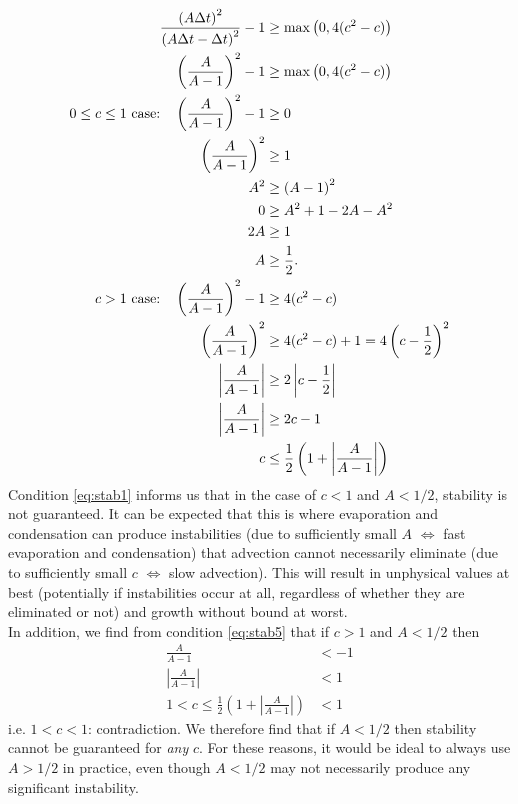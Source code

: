 \documentclass[11pt]{article}
\begin{document}
\begin{align}
\frac{\left(A\Delta t\right)^2}{\left(A\Delta t-\Delta t\right)^2}-1 &\geq \max\left(0,4(c^2-c)\right) \nonumber\\
\left(\frac{A}{A-1}\right)^2 -1 &\geq \max\left(0,4(c^2-c)\right) \nonumber\\
\text{$0\leq c\leq 1$ case:\quad} \left(\frac{A}{A-1}\right)^2 -1 &\geq 0 \nonumber\\
\left(\frac{A}{A-1}\right)^2 &\geq 1 \nonumber\\
A^2 &\geq \left(A-1\right)^2 \nonumber\\
0 &\geq A^2 + 1 - 2A - A^2 \nonumber\\
2A &\geq 1 \nonumber\\
A &\geq \frac{1}{2}.		\label{eq:stab1} \\
\text{$c>1$ case:\quad} \left(\frac{A}{A-1}\right)^2 -1 &\geq 4(c^2-c)		\label{eq:stab4} \\
\left(\frac{A}{A-1}\right)^2 &\geq 4(c^2-c)+1 = 4\left(c-\frac{1}{2}\right)^2 \nonumber \\
\left|\frac{A}{A-1}\right| &\geq 2\left|c-\frac{1}{2}\right| \nonumber \\
\left|\frac{A}{A-1}\right| &\geq 2c-1 \nonumber \\
c &\leq \frac{1}{2}\left(1 + \left|\frac{A}{A-1}\right|\right) 	\label{eq:stab5}
\end{align}
Condition \ref{eq:stab1} informs us that in the case of $c<1$ and $A<1/2$, stability is not guaranteed. It can be expected that this is where evaporation and condensation can produce instabilities (due to sufficiently small $A$ $\Leftrightarrow$ fast evaporation and condensation) that advection cannot necessarily eliminate (due to sufficiently small $c$ $\Leftrightarrow$ slow advection). This will result in unphysical values at best (potentially if instabilities occur at all, regardless of whether they are eliminated or not) and growth without bound at worst. \\
In addition, we find from condition \ref{eq:stab5} that if $c>1$ and $A<1/2$ then
\begin{align*}
\frac{A}{A-1} &< -1 \\
\left|\frac{A}{A-1}\right| &< 1 \\
1 < c \leq \frac{1}{2}\left(1 + \left|\frac{A}{A-1}\right|\right) &< 1
\end{align*}
i.e. $1<c<1$: contradiction. We therefore find that if $A<1/2$ then stability cannot be guaranteed for \emph{any} $c$. For these reasons, it would be ideal to always use $A>1/2$ in practice, even though $A<1/2$ may not necessarily produce any significant instability. \\
\end{document}
